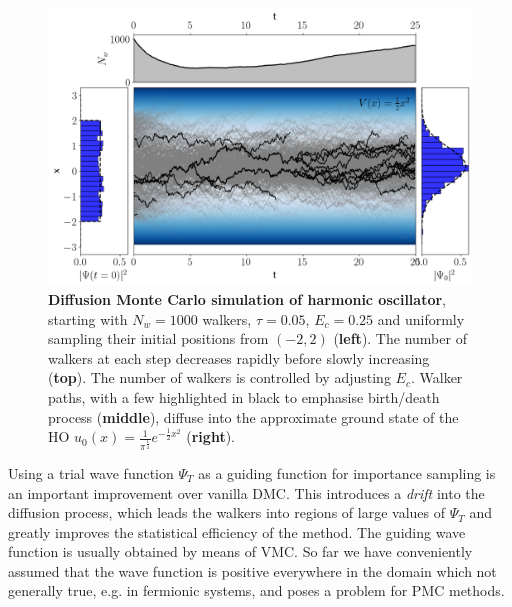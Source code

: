 \begin{figure}[H]
	\centering
	\includegraphics[width=\linewidth]{Chapter2/Figs/Raster/dmc.png}
	\caption[DMC simulation of harmonic oscillator]{\textbf{Diffusion Monte Carlo simulation of harmonic oscillator}, starting with $N_w=1000$ walkers, $\tau=0.05$, $E_c=0.25$ and uniformly sampling their initial positions from $(-2, 2)$ (\textbf{left}). The number of walkers at each step decreases rapidly before slowly increasing (\textbf{top}). The number of walkers is controlled by adjusting $E_c$. Walker paths, with a few highlighted in black to emphasise birth/death process (\textbf{middle}), diffuse into the approximate ground state of the HO $u_0(x) = \frac{1}{\pi^{\frac{1}{4}}}e^{-\frac{1}{2}x^2}$ (\textbf{right}).}
	\label{fig:dmc}
\end{figure}
Using a trial wave function $\Psi_T$ as a guiding function for importance sampling is an important improvement over vanilla DMC. This introduces a \emph{drift} into the diffusion process, which leads the walkers into regions of large values of $\Psi_T$ and greatly improves the statistical efficiency of the method. The guiding wave function is usually obtained by means of VMC. So far we have conveniently assumed that the wave function is positive everywhere in the domain which not generally true, e.g. in fermionic systems, and poses a problem for PMC methods.

